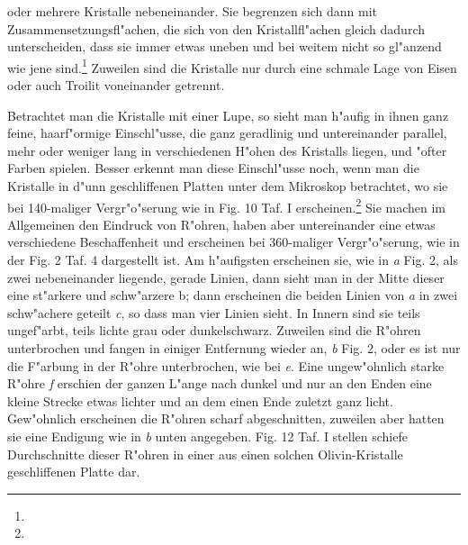 \documentclass[a4paper, 11pt, oneside]{article}
\begin{document}
oder mehrere Kristalle nebeneinander. Sie begrenzen sich dann mit Zusammensetzungsfl"achen, die sich von den Kristallfl"achen gleich dadurch unterscheiden, dass sie immer etwas uneben und bei weitem nicht so gl"anzend wie jene sind.\footnote{} Zuweilen sind die Kristalle nur durch eine schmale Lage von Eisen oder auch Troilit voneinander getrennt.

Betrachtet man die Kristalle mit einer Lupe, so sieht man h"aufig in ihnen ganz feine, haarf"ormige Einschl"usse, die ganz geradlinig und untereinander parallel, mehr oder weniger lang in verschiedenen H"ohen des Kristalls liegen, und "ofter Farben spielen. Besser erkennt man diese Einschl"usse noch, wenn man die Kristalle in d"unn geschliffenen Platten unter dem Mikroskop betrachtet, wo sie bei 140-maliger Vergr"o"serung wie in Fig. 10 Taf. I erscheinen.\footnote{} Sie machen im Allgemeinen den Eindruck von R"ohren, haben aber untereinander eine etwas verschiedene Beschaffenheit und erscheinen bei 360-maliger Vergr"o"serung, wie in der Fig. 2 Taf. 4 dargestellt ist. Am h"aufigsten erscheinen sie, wie in \emph{a} Fig. 2, als zwei nebeneinander liegende, gerade Linien, dann sieht man in der Mitte dieser eine st"arkere und schw"arzere b; dann erscheinen die beiden Linien von \emph{a} in zwei schw"achere geteilt \emph{c}, so dass man vier Linien sieht. In Innern sind sie teils ungef"arbt, teils lichte grau oder dunkelschwarz. Zuweilen sind die R"ohren unterbrochen und fangen in einiger Entfernung wieder an, \emph{b} Fig. 2, oder es ist nur die F"arbung in der R"ohre unterbrochen, wie bei \emph{e}. Eine ungew"ohnlich starke R"ohre \emph{f} erschien der ganzen L"ange nach dunkel und nur an den Enden eine kleine Strecke etwas lichter und an dem einen Ende zuletzt ganz licht. Gew"ohnlich erscheinen die R"ohren scharf abgeschnitten, zuweilen aber hatten sie eine Endigung wie in \emph{b} unten angegeben. Fig. 12 Taf. I stellen schiefe Durchschnitte dieser R"ohren in einer aus einen solchen Olivin-Kristalle geschliffenen Platte dar.
\end{document}
